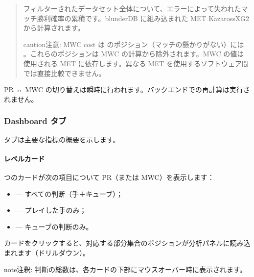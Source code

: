 \documentclass[letterpaper,10pt,dvipdfmx]{sphinxmanual}
\begin{document}
\sphinxAtStartPar
{}
\begin{quote}

\sphinxAtStartPar
フィルターされたデータセット全体について、エラーによって失われたマッチ勝利確率の累積です。blunderDB に組み込まれた MET Kazaross\sphinxhyphen{}XG2 から計算されます。

\begin{sphinxadmonition}{caution}{注意:}
\sphinxAtStartPar
MWC cost は  のポジション（マッチの懸かりがない）には 。これらのポジションは MWC の計算から除外されます。MWC の値は使用される MET に依存します。異なる MET を使用するソフトウェア間では直接比較できません。
\end{sphinxadmonition}
\end{quote}

\sphinxAtStartPar
PR ↔ MWC の切り替えは瞬時に行われます。バックエンドでの再計算は実行されません。


\subsubsection{Dashboard タブ}
\label{\detokenize{manuel:onglet-dashboard}}
\sphinxAtStartPar
{} タブは主要な指標の概要を示します。


\paragraph{レベルカード}
\label{\detokenize{manuel:cartes-de-niveau}}
 つのカードが次の項目について PR（または MWC）を表示します：
\begin{itemize}
\item {} 
\sphinxAtStartPar
{} — すべての判断（手＋キューブ）；

\item {} 
\sphinxAtStartPar
{} — プレイした手のみ；

\item {} 
\sphinxAtStartPar
{} — キューブの判断のみ。

\end{itemize}

\sphinxAtStartPar
カードをクリックすると、対応する部分集合のポジションが分析パネルに読み込まれます（ドリルダウン）。

\begin{sphinxadmonition}{note}{注釈:}
\sphinxAtStartPar
判断の総数は、各カードの下部にマウスオーバー時に表示されます。
\end{sphinxadmonition}
\end{document}
